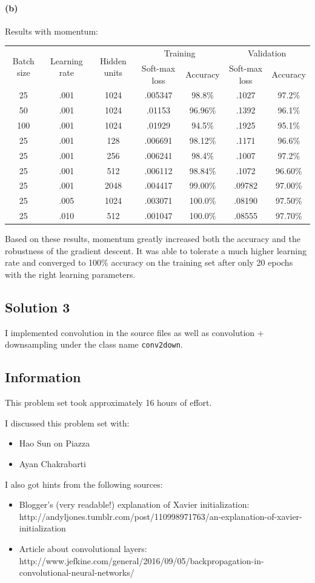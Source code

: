 \documentclass{article}
\newcommand{\info}{\clearpage \subsection*{Information}}
\newcommand{\solution}[1]{\clearpage \subsection*{Solution #1}}
\newcommand{\spart}[1]{\paragraph{(#1)}}
\begin{document}
\spart{b} Results with momentum:

\begin{center}
\begin{tabular}{ c c c c c c c }
\hline
\multirow{2}{*}{Batch size} & 
\multirow{2}{*}{Learning rate} & 
\multirow{2}{*}{Hidden units} & 
\multicolumn{2}{c}{ Training } &
\multicolumn{2}{c}{ Validation } \\
	&&& Soft-max loss & Accuracy & Soft-max loss & Accuracy \\
\hline
25 & .001 & 1024 & .005347 & 98.8\% & .1027 & 97.2\% \\
50 & .001 & 1024 & .01153 & 96.96\% & .1392 & 96.1\% \\
100 & .001 & 1024 & .01929 & 94.5\% & .1925 & 95.1\% \\
25 & .001 & 128 & .006691 & 98.12\% & .1171 & 96.6\% \\
25 & .001 & 256 & .006241 & 98.4\% & .1007 & 97.2\% \\
25 & .001 & 512 & .006112 & 98.84\% & .1072 & 96.60\% \\
25 & .001 & 2048 & .004417 & 99.00\% & .09782 & 97.00\% \\
25 & .005 & 1024 & .003071 & 100.0\% & .08190 & 97.50\% \\
25 & .010 & 512 & .001047 & 100.0\% & .08555 & 97.70\% \\
\hline
\end{tabular}
\end{center}

Based on these results, momentum greatly increased both the accuracy and the robustness of the gradient descent. It was able to tolerate a much higher learning rate and converged to 100\% accuracy on the training set after only 20 epochs with the right learning parameters. 

\solution{3}

I implemented convolution in the source files as well as convolution + downsampling under the class name \texttt{conv2down}.

\info

This problem set took approximately 16 hours of effort.


I discussed this problem set with:
\begin{itemize}
\item Hao Sun on Piazza
\item Ayan Chakrabarti
\end{itemize}


I also got hints from the following sources:
\begin{itemize}
\item Blogger's (very readable!) explanation of Xavier initialization: http://andyljones.tumblr.com/post/110998971763/an-explanation-of-xavier-initialization
\item Article about convolutional layers: http://www.jefkine.com/general/2016/09/05/backpropagation-in-convolutional-neural-networks/
\end{itemize}
\end{document}
